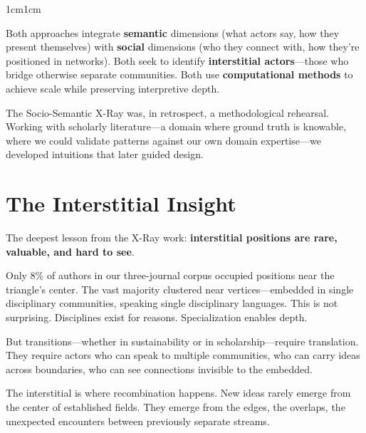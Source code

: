 \documentclass[../main.tex]{subfiles}
\begin{document}
\begin{adjustwidth}{1cm}{1cm}
\begin{center}
\begin{tikzpicture}[scale=1.0]
\end{tikzpicture}
\end{center}


Both approaches integrate \textbf{semantic} dimensions (what actors say, how they present themselves) with \textbf{social} dimensions (who they connect with, how they're positioned in networks). Both seek to identify \textbf{interstitial actors}---those who bridge otherwise separate communities. Both use \textbf{computational methods} to achieve scale while preserving interpretive depth.

The Socio-Semantic X-Ray was, in retrospect, a methodological rehearsal. Working with scholarly literature---a domain where ground truth is knowable, where we could validate patterns against our own domain expertise---we developed intuitions that later guided \RoleBox design.

\vspace{0.8cm}

\section*{The Interstitial Insight}

The deepest lesson from the X-Ray work: \textbf{interstitial positions are rare, valuable, and hard to see}.


Only 8\% of authors in our three-journal corpus occupied positions near the triangle's center. The vast majority clustered near vertices---embedded in single disciplinary communities, speaking single disciplinary languages. This is not surprising. Disciplines exist for reasons. Specialization enables depth.

But transitions---whether in sustainability or in scholarship---require translation. They require actors who can speak to multiple communities, who can carry ideas across boundaries, who can see connections invisible to the embedded.

\begin{pandaquote}
The interstitial is where recombination happens. New ideas rarely emerge from the center of established fields. They emerge from the edges, the overlaps, the unexpected encounters between previously separate streams.
\end{pandaquote}


\end{adjustwidth}
\end{document}
